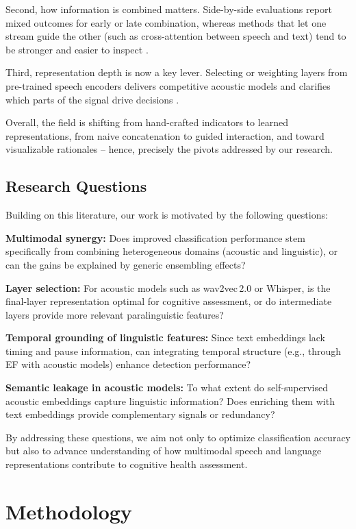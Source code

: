 \documentclass{article}
\begin{document}
{Second, how information is combined matters. Side-by-side evaluations report mixed outcomes for early or late combination, whereas methods that let one stream guide the other (such as cross-attention between speech and text) tend to be stronger and easier to inspect \cite{krstev2022,pan2024,altinok2024,zhang2025}.

Third, representation depth is now a key lever. Selecting or weighting layers from pre-trained speech encoders delivers competitive acoustic models and clarifies which parts of the signal drive decisions \cite{pan2025,javanmardi2024,li2024}.

Overall, the field is shifting from hand-crafted indicators to learned representations, from naive concatenation to guided interaction, and toward visualizable rationales -- hence, precisely the pivots addressed by our research.

\subsection{Research Questions}
Building on this literature, our work is motivated by the following questions:

\textbf{Multimodal synergy:} Does improved classification performance stem specifically from combining heterogeneous domains (acoustic and linguistic), or can the gains be explained by generic ensembling effects?

\textbf{Layer selection:} For acoustic models such as wav2vec\,2.0 or Whisper, is the final-layer representation optimal for cognitive assessment, or do intermediate layers provide more relevant paralinguistic features?

\textbf{Temporal grounding of linguistic features:} Since text embeddings lack timing and pause information, can integrating temporal structure (e.g., through EF with acoustic models) enhance detection performance?

\textbf{Semantic leakage in acoustic models:} To what extent do self-supervised acoustic embeddings capture linguistic information? Does enriching them with text embeddings provide complementary signals or redundancy?

By addressing these questions, we aim not only to optimize classification accuracy but also to advance understanding of how multimodal speech and language representations contribute to cognitive health assessment.

\section{Methodology}
\label{sec:format}

}
\end{document}
